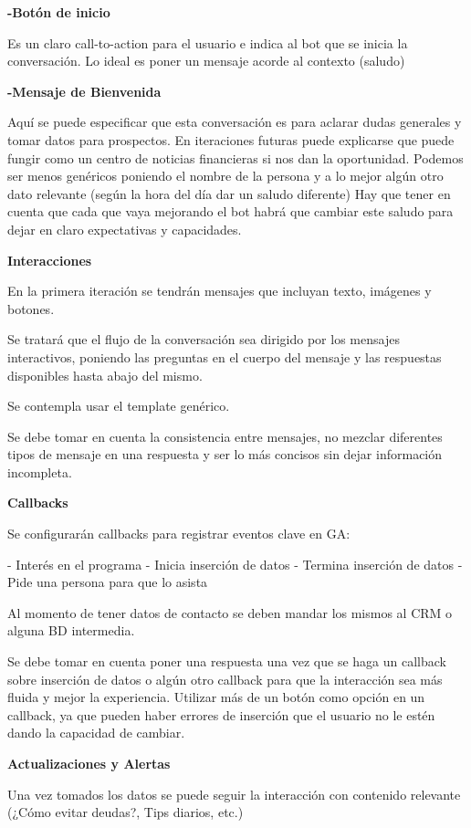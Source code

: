 \textbf{-Botón de inicio}

 Es un claro call-to-action para el usuario e indica al bot que se inicia la conversación. Lo ideal es poner un mensaje acorde al contexto (saludo)

\textbf{-Mensaje de Bienvenida}

Aquí se puede especificar que esta conversación es para aclarar dudas generales y tomar datos para prospectos. En iteraciones futuras puede explicarse que puede fungir como un centro de noticias financieras si nos dan la oportunidad. Podemos ser menos genéricos poniendo el nombre de la persona y a lo mejor algún otro dato relevante (según la hora del día dar un saludo diferente)
Hay que tener en cuenta que cada que vaya mejorando el bot habrá que cambiar este saludo para dejar en claro expectativas y capacidades.

\textbf{Interacciones}

En la primera iteración se tendrán mensajes que incluyan texto, imágenes y botones.

Se tratará que el flujo de la conversación sea dirigido por los mensajes interactivos, poniendo las preguntas en el cuerpo del mensaje y las respuestas disponibles hasta abajo del mismo.

Se contempla usar el template genérico.

Se debe tomar en cuenta la consistencia entre mensajes, no mezclar diferentes tipos de mensaje en una respuesta y ser lo más concisos sin dejar información incompleta.

\textbf{Callbacks}

Se configurarán callbacks para registrar eventos clave en GA:

- Interés en el programa
- Inicia inserción de datos
- Termina inserción de datos
- Pide una persona para que lo asista


Al momento de tener datos de contacto se deben mandar los mismos al CRM o alguna BD intermedia.

Se debe tomar en cuenta poner una respuesta una vez que se haga un callback sobre inserción de datos o algún otro callback para que la interacción sea más fluida y mejor la experiencia.
Utilizar más de un botón como opción en un callback, ya que pueden haber errores de inserción que el usuario no le estén dando la capacidad de cambiar.

\textbf{Actualizaciones y Alertas}

Una vez tomados los datos se puede seguir la interacción con contenido relevante (¿Cómo evitar deudas?, Tips diarios, etc.)

